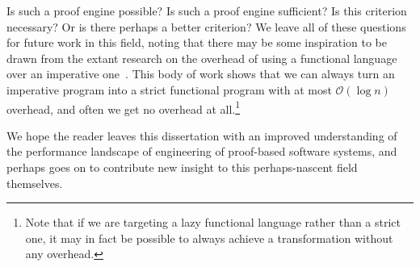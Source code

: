 Is such a proof engine possible?
Is such a proof engine sufficient?
Is this criterion necessary?
Or is there perhaps a better criterion?
We leave all of these questions for future work in this field, noting that there may be some inspiration to be drawn from the extant research on the overhead of using a functional language over an imperative one~\cite{Efficiency2010Campbell,Ben-AmramG92,Ben-amram96noteson,More1997Bird,okasaki1996purely,okasaki1998purely,Pure1997Pippenger}.
This body of work shows that we can always turn an imperative program into a strict functional program with at most $\mathcal O(\log n)$ overhead, and often we get no overhead at all.\footnote{%
  Note that if we are targeting a lazy functional language rather than a strict one, it may in fact be possible to always achieve a transformation without any overhead.%
}

We hope the reader leaves this dissertation with an improved understanding of the performance landscape of engineering of proof-based software systems, and perhaps goes on to contribute new insight to this perhaps-nascent field themselves.

